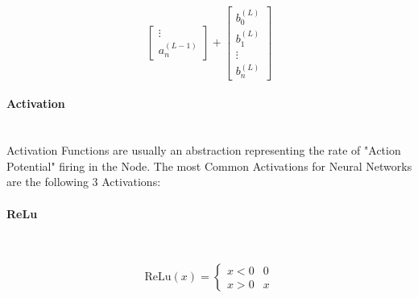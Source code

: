 \begin{flushleft}
\begin{center}
\[\begin{bmatrix}
                        \vdots      \\
                        a^{(L-1)}_{n} 
                        \end{bmatrix}
                        +
                        \begin{bmatrix}
                        b^{(L)}_{0} \\
                        b^{(L)}_{1} \\
                        \vdots      \\
                        b^{(L)}_{n} 
                        \end{bmatrix}
                        \]
                    \end{center}
                    \vspace{0.2cm}

                \paragraph{Activation} \mbox{} \\
                    \vspace{0.2cm}
                    Activation Functions are usually an abstraction representing the rate of "Action Potential" firing in the Node.
                    The most Common Activations for Neural Networks are the following 3 Activations: \\
                \paragraph{ReLu} \mbox{} \\
                    \begin{center}
                        \[
                            \text{ReLu}(x) =  \begin{cases}
                                                x < 0 & 0 \\
                                                x > 0 & x
                                                \end{cases}
                        \]
                        
                        \vspace{0.2cm}
                    \end{center}


\end{flushleft}
